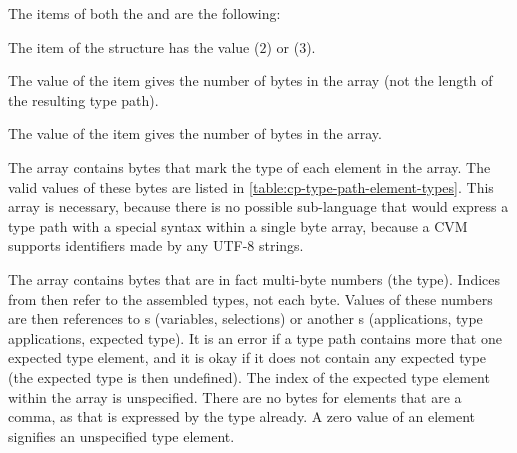The items of both the  and  are the following:
\begin{description}[font=\ttfamily\mdseries,style=nextline]
  \item[tag]
  The  item of the structure has the value  ($2$) or  ($3$). 
  \item[length]
  The value of the  item gives the number of bytes in the  array (not the length of the resulting type path).
  \item[element\_count]
  The value of the  item gives the number of bytes in the  array.
  \item[element\_types]
  The  array contains bytes that mark the type of each element in the  array. The valid values of these bytes are listed in \autoref{table:cp-type-path-element-types}. This array is necessary, because there is no possible sub-language that would express a type path with a special syntax within a single byte array, because a CVM supports identifiers made by any \mbox{UTF-8} strings. 
  \item[elements]
  The  array contains bytes that are in fact multi-byte numbers (the  type). Indices from  then refer to the assembled  types, not each byte. Values of these numbers are then references to s (variables, selections) or another s (applications, type applications, expected type). It is an error if a type path contains more that one expected type element, and it is okay if it does not contain any expected type (the expected type is then undefined). The index of the expected type element within the  array is unspecified. There are no bytes for elements that are a comma, as that is expressed by the type already. A zero value of an element signifies an unspecified type element. 
\end{description}


